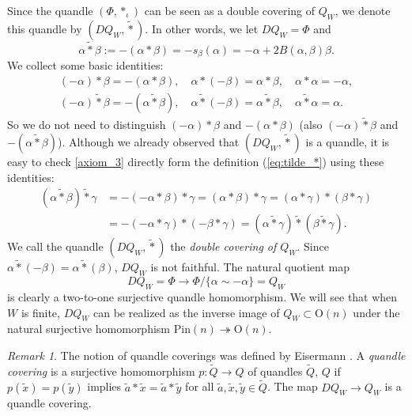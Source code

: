 \documentclass{amsart}
\theoremstyle{definition}
\theoremstyle{remark}
\newtheorem{remark}[theorem]{Remark}
\numberwithin{equation}{section}
\begin{document}
Since the quandle $(\Phi, *_{\iota})$ can be seen as a double covering of $Q_W$, 
we denote this quandle by $(DQ_W, \widetilde{*})$.
In other words, we let $DQ_W = \Phi$ and 
\begin{equation}
\label{eq:tilde_*}
\alpha \widetilde{*} \beta :=  -(\alpha * \beta) 
= -s_{\beta} (\alpha) = -\alpha + 2 B(\alpha, \beta) \beta.
\end{equation}
We collect some basic identities:
\[
\begin{split}
(-\alpha) * \beta = - (\alpha * \beta), \quad \alpha * (-\beta) = \alpha * \beta, \quad
\alpha * \alpha = - \alpha, \\
(-\alpha) \widetilde{*} \beta = - (\alpha \widetilde{*} \beta), 
\quad \alpha \widetilde{*} (-\beta) = \alpha \widetilde{*} \beta, 
\quad \alpha \widetilde{*} \alpha = \alpha.
\end{split}
\]
So we do not need to distinguish $(-\alpha) * \beta$ and $-(\alpha * \beta)$
(also $(-\alpha) \widetilde{*} \beta$ and $- (\alpha \widetilde{*} \beta)$).
Although we already observed that $(DQ_W, \widetilde{*})$ is a quandle, 
it is easy to check \ref{axiom_3} directly form the definition (\ref{eq:tilde_*})
using these identities:
\[
\begin{split}
(\alpha \widetilde{*} \beta) \widetilde{*} \gamma 
&= - (- \alpha * \beta) * \gamma
= (\alpha * \beta) * \gamma  
= (\alpha * \gamma) * (\beta * \gamma) \\
&= -(-\alpha * \gamma) * (- \beta * \gamma ) 
= (\alpha \widetilde{*} \gamma) \widetilde{*} (\beta \widetilde{*} \gamma).
\end{split}
\]
We call the quandle $(DQ_W, \widetilde{*})$ the \emph{double covering of $Q_W$}. 
Since $\alpha \widetilde{*} (-\beta) = \alpha \widetilde{*} (\beta)$, $DQ_W$ 
is not faithful.
The natural quotient map
\[
DQ_W = \Phi \longrightarrow \Phi /  \{ \alpha \sim - \alpha \} = Q_W
\]
is clearly a two-to-one surjective quandle homomorphism.
We will see that when $W$ is finite,  
$DQ_W$ can be realized as the inverse image of $Q_W \subset \mathrm{O}(n)$ 
under the natural surjective homomorphism 
$\mathrm{Pin}(n) \twoheadrightarrow  \mathrm{O}(n)$.

\begin{remark}
The notion of quandle coverings was defined by Eisermann \cite{Eisermann}.
A \emph{quandle covering} is a surjective homomorphism $p : \widetilde{Q} \to Q$ 
of quandles $\widetilde{Q}$, $Q$ if $p(\widetilde{x}) = p(\widetilde{y})$ implies 
$\widetilde{a} * \widetilde{x} = \widetilde{a} * \widetilde{y}$ for all 
$\widetilde{a}, \widetilde{x}, \widetilde{y} \in \widetilde{Q}$.
The map $DQ_{W} \to Q_W$ is a quandle covering.
\end{remark}
\end{document}
